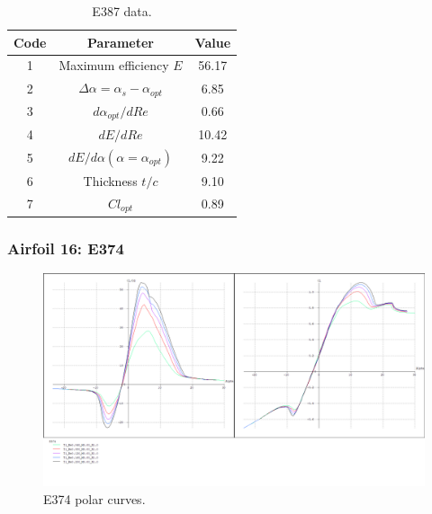 \documentclass[../TFG_Annex.tex]{subfiles}
\begin{document}
\begin{table}[h!]
	\centering
	\begin{tabular}{c|c|c}
		Code & Parameter                                    & Value  \\ \hline
		1    & Maximum efficiency $E$                      &  56.17   \\
		2    & $\Delta \alpha=\alpha_{s}-\alpha_{opt}$    &        6.85          \\
		3    & ${d\alpha_{opt}}/{dRe}$                     &           0.66     \\
		4    & ${dE}/{dRe}$                                &        10.42     \\
		5    & ${dE}/{d \alpha} (\alpha=\alpha_{opt})$      &           9.22        \\
		6    & Thickness $t/c$                            &              9.10      \\
		7    & $Cl_{opt}$  &   0.89
	\end{tabular}
	\caption{E387 data.}
	\label{tab:Airf15}
\end{table}


\newpage
\subsubsection{Airfoil 16: E374}


\begin{figure}[h!]
	\centering
	\includegraphics[width=1\linewidth]{"../../04-Airfoil selection/Imatges airfoils/16-E374"}
	\caption{E374 polar curves.}
	\label{fig:16-E374}
\end{figure}
\end{document}
